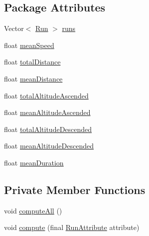 \subsection*{Package Attributes}
\begin{DoxyCompactItemize}
\item 
Vector$<$ \mbox{\hyperlink{classcom_1_1activitytracker_1_1_run}{Run}} $>$ \mbox{\hyperlink{classcom_1_1activitytracker_1_1_run_stats_a0fd429e9f463ddf4897c507c0e3c0a12}{runs}}
\item 
float \mbox{\hyperlink{classcom_1_1activitytracker_1_1_run_stats_a64b9e6daf2be19571b8ad401922762c2}{mean\+Speed}}
\item 
float \mbox{\hyperlink{classcom_1_1activitytracker_1_1_run_stats_a2e9486ea214a828e9f58489fd2b1a718}{total\+Distance}}
\item 
float \mbox{\hyperlink{classcom_1_1activitytracker_1_1_run_stats_afcc9ab47852b6df6b15e9a592fe6c5ed}{mean\+Distance}}
\item 
float \mbox{\hyperlink{classcom_1_1activitytracker_1_1_run_stats_a1108dd2b031415da72508a5172335dd4}{total\+Altitude\+Ascended}}
\item 
float \mbox{\hyperlink{classcom_1_1activitytracker_1_1_run_stats_aecbe62c15075fe9be1604333c355fab6}{mean\+Altitude\+Ascended}}
\item 
float \mbox{\hyperlink{classcom_1_1activitytracker_1_1_run_stats_ae511b3772f61773885d0178b215786d7}{total\+Altitude\+Descended}}
\item 
float \mbox{\hyperlink{classcom_1_1activitytracker_1_1_run_stats_a578eae64367a00c625f4685fe879fe7c}{mean\+Altitude\+Descended}}
\item 
float \mbox{\hyperlink{classcom_1_1activitytracker_1_1_run_stats_a8bf9f1577cffd26e6235695278bfcdb9}{mean\+Duration}}
\end{DoxyCompactItemize}
\subsection*{Private Member Functions}
\begin{DoxyCompactItemize}
\item 
void \mbox{\hyperlink{classcom_1_1activitytracker_1_1_run_stats_a85018dbaae7a08213d443a0697e59ee4}{compute\+All}} ()
\item 
void \mbox{\hyperlink{classcom_1_1activitytracker_1_1_run_stats_ac73cb94cc8ff604fe446d9a327e420cc}{compute}} (final \mbox{\hyperlink{enumcom_1_1activitytracker_1_1_run_attribute}{Run\+Attribute}} attribute)
\end{DoxyCompactItemize}


